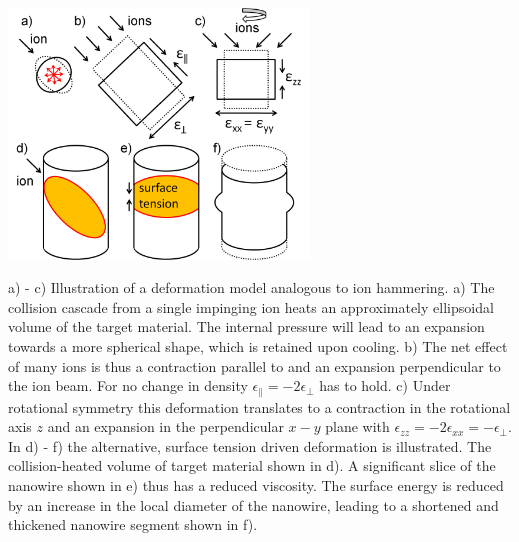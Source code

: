 \begin{Figure}[h]
\begin{Figure}[thbp]
	\centering
		\includegraphics[width=8cm]{images/deformationmodel.jpg}
	\caption{a) - c) Illustration of a deformation model analogous to ion hammering. a) The collision cascade from a single impinging ion heats an approximately ellipsoidal volume of the target material. The internal pressure will lead to an expansion towards a more spherical shape, which is retained upon cooling. b) The net effect of many ions is thus a contraction parallel to and an expansion perpendicular to the ion beam. For no change in density $\epsilon_\parallel = -2\epsilon_\perp$ has to hold. c) Under rotational symmetry this deformation translates to a contraction in the rotational axis $z$ and an expansion in the perpendicular $x-y$ plane with $\epsilon_{zz} = -2\epsilon_{xx} = -\epsilon_\perp$. In d) - f) the alternative, surface tension driven deformation is illustrated. The collision-heated volume of target material shown in d). A significant slice of the nanowire shown in e) thus has a reduced viscosity. The surface energy is reduced by an increase in the local diameter of the nanowire, leading to a shortened and thickened nanowire segment shown in f).} 
	\label{deformationmodel}
\end{Figure}


\end{Figure}
